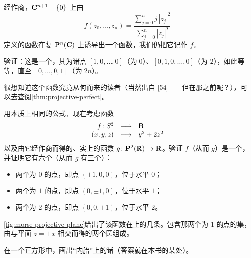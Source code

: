 \begin{exercise}[论复\trProjectiveSpace]\label{ex:ch01-05}
经作商，$\mathbf{C}^{n+1}-\{0\}$ 上由
\[
f(z_0,\dotsc,z_n)=\frac{\displaystyle\sum_{j=0}^{n} j\,|z_j|^2}
                         {\displaystyle\sum_{j=0}^{n}|z_j|^2}
\]
定义的函数在复\trProjectiveSpace{} $\mathbf{P}^n(\mathbf{C})$ 上诱导出一个函数，我们仍把它记作 $f$。

验证：这是一个\trMorseFunction，其\trCriticalPoint{}为诸点 $[1,0,\dotsc,0]$（\trIndex{}为 $0$）、$[0,1,0,\dotsc,0]$（\trIndex{}为 $2$），如此等等，直至 $[0,\dotsc,0,1]$（\trIndex{}为 $2n$）。
\end{exercise}

很想知道这个函数究竟从何而来的读者（当然出自 [54]——但在那之前呢？），可以去查阅\cref{thm:projective-perfect}。

\begin{exercise}\label{ex:ch01-06}
用本质上相同的公式，现在考虑函数
\[
\begin{array}{rcl}
f\colon S^2 & \longrightarrow & \mathbf{R}\\
(x,y,z) & \longmapsto & y^2+2z^2
\end{array}
\]
以及由它经作商而得的、实\trProjectivePlane{}上的函数 $g\colon \mathbf{P}^2(\mathbf{R})\to\mathbf{R}$。验证 $f$（从而 $g$）是一个\trMorseFunction，并证明它有六个\trCriticalPoint（从而 $g$ 有三个）：
\begin{itemize}
\item 两个\trIndex{}为 $0$ 的点，即点 $(\pm1,0,0)$，位于水平 $0$；
\item 两个\trIndex{}为 $1$ 的点，即点 $(0,\pm1,0)$，位于水平 $1$；
\item 两个\trIndex{}为 $2$ 的点，即点 $(0,0,\pm1)$，位于水平 $2$。
\end{itemize}
\cref{fig:morse-projective-plane}给出了该函数在\trSphere{}上的几条\trLevelSet。包含那两个\trIndex{}为 $1$ 的点的\trCriticalLevel{}集，由\trSphere{}与平面 $z=\pm x$ 相交而得的两个圆组成。
\end{exercise}

\begin{exercise}\label{ex:ch01-07}
在一个正方形中，画出“内胎”\trTorus{}上\trHeightFunction{}的诸\trLevelSet（答案就在本书的某处）。
\end{exercise}

